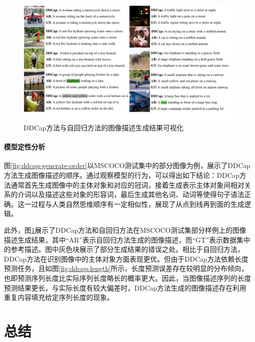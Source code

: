 \begin{figure}
  \centering
  \includegraphics[width=1.0\linewidth]{figures/ddcap-qualification.pdf}
  \caption{DDCap方法与自回归方法的图像描述生成结果可视化}
  \label{fig:ddcap-qualification}
\end{figure}


\paragraph{模型定性分析} 图\ref{fig:ddcap-generate-order}以MSCOCO测试集中的部分图像为例，展示了DDCap方法生成图像描述的顺序。通过观察模型的行为，可以得出如下结论：DDCap方法通常首先生成图像中的主体对象和对应的冠词，接着生成表示主体对象间相对关系的介词以及描述这些对象的形容词，最后生成其他名词、动词等使得句子语法正确。这一过程与人类自然思维顺序有一定相似性，展现了从点到线再到面的生成逻辑。

此外，图\ref{fig:ddcap-qualification}展示了DDCap方法和自回归方法在MSCOCO测试集部分样例上的图像描述生成结果，其中“AR”表示自回归方法生成的图像描述，而“GT”表示数据集中的参考描述。图中灰色块展示了部分生成结果的错误之处。相比于自回归方法，DDCap方法在识别图像中的主体对象方面表现更优。但由于DDCap方法依赖长度预测任务，且如图\ref{fig:ddcap-length}所示，长度预测误差存在较明显的分布倾向，也即预测序列长度比实际序列长度略长的概率更大。因此，当图像描述序列的长度预测结果更长，与实际长度有较大偏差时，DDCap方法生成的图像描述存在利用重复内容填充给定序列长度的现象。

\section{总结}
\label{sec:ddcap-summary}

